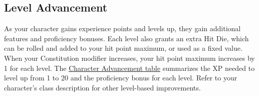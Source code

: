 \subsection{Level Advancement}\label{_level_advancement}

As your character gains experience points and levels up, they gain
additional features and proficiency bonuses. Each level also grants an
extra Hit Die, which can be rolled and added to your hit point maximum,
or used as a fixed value. When your Constitution modifier increases,
your hit point maximum increases by 1 for each level. The
\hyperref[level-advancement-character-advancement-table]{Character
Advancement table} summarizes the XP needed to level up from 1 to 20 and
the proficiency bonus for each level. Refer to your character's class
description for other level-based improvements.

